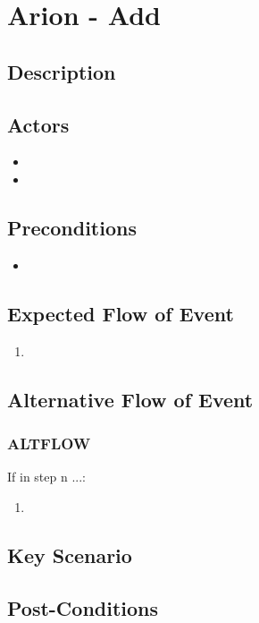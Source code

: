 \documentclass{scrreprt}
\begin{document}
\chapter*{Arion - Add}

\section*{Description}

\section*{Actors}
\begin{itemize}
    \item 
    \item 
\end{itemize}

\section*{Preconditions}
\begin{itemize}
    \item 
\end{itemize}

\section*{Expected Flow of Event}
\begin{enumerate}[1.]
    \item 
\end{enumerate}

\section*{Alternative Flow of Event}
\subsection*{ALTFLOW}
If in step n ...:
\begin{enumerate}
    \item 
\end{enumerate}

\section*{Key Scenario}

\section*{Post-Conditions}
\end{document}
